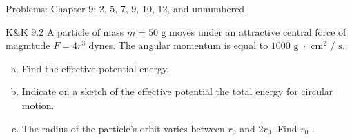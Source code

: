 \documentclass{esg8012pset}
\begin{document}
\noindent Problems: Chapter 9: 2, 5, 7, 9, 10, 12, and unnumbered

\begin{problem}{K\&K 9.2}
  A particle of mass $m = 50\text{ g}$ moves under an attractive central force of magnitude $F = 4r^3$ dynes. The angular momentum is equal to $1000\text{ g $\cdot$ cm$^2$ / s}$.
  \begin{enumerate}[(a)]
    \item Find the effective potential energy.
    \item Indicate on a sketch of the effective potential the total energy for circular motion.
    \item The radius of the particle's orbit varies between $r_0$ and $2r_0$. Find $r_0$ .
  \end{enumerate}
\end{problem}
\end{document}
